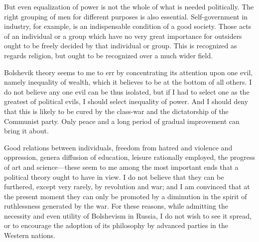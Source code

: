 But even equalization of power is not the whole of what is needed politically. The right grouping of men for different purposes is also essential. Self-government in industry, for example, is an indispensable condition of a good society. Those acts of an individual or a group which have no very great importance for outsiders ought to be freely decided by that individual or group. This is recognized as regards religion, but ought to be recognized over a much wider field.

Bolshevik theory seems to me to err by concentrating its attention upon one evil, namely inequality of wealth, which it believes to be at the bottom of all others. I do not believe any one evil can be thus isolated, but if I had to select one as the greatest of political evils, I should select inequality of power. And I should deny that this is likely to be cured by the class-war and the dictatorship of the Communist party. Only peace and a long period of gradual improvement can bring it about.

Good relations between individuals, freedom from hatred and violence and oppression, genera diffusion of education, leisure rationally employed, the progress of art and science---these seem to me among the most important ends that a political theory ought to have in view. I do not believe that they can be furthered, except very rarely, by revolution and war; and I am convinced that at the present moment they can only be promoted by a diminution in the spirit of ruthlessness generated by the war. For these reasons, while admitting the necessity and even utility of Bolshevism in Russia, I do not wish to see it spread, or to encourage the adoption of its philosophy by advanced parties in the Western nations.